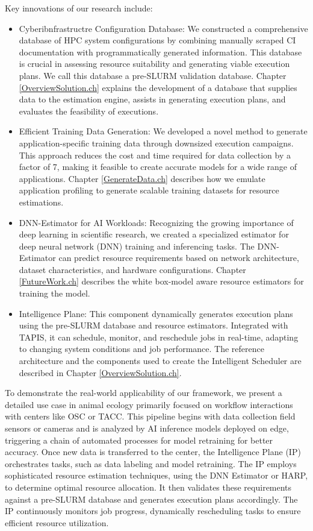 Key innovations of our research include:
\begin{itemize}
    \item Cyberibnfrastructre Configuration Database: We constructed a comprehensive database of HPC system configurations by combining manually scraped CI documentation with programmatically generated information. This database is crucial in assessing resource suitability and generating viable execution plans. We call this database a pre-SLURM validation database. Chapter \ref{OverviewSolution.ch} explains the development of a database that supplies data to the estimation engine, assists in generating execution plans, and evaluates the feasibility of executions.
    \item Efficient Training Data Generation: We developed a novel method to generate application-specific training data through downsized execution campaigns. This approach reduces the cost and time required for data collection by a factor of 7, making it feasible to create accurate models for a wide range of applications. Chapter \ref{GenerateData.ch} describes how we emulate application profiling to generate scalable training datasets for resource estimations. 
    \item DNN-Estimator for AI Workloads: Recognizing the growing importance of deep learning in scientific research, we created a specialized estimator for deep neural network (DNN) training and inferencing tasks. The DNN-Estimator can predict resource requirements based on network architecture, dataset characteristics, and hardware configurations. Chapter \ref{FutureWork.ch} describes the white box-model aware resource estimators for training the model. 
    \item Intelligence Plane: This component dynamically generates execution plans using the pre-SLURM database and resource estimators. Integrated with TAPIS, it can schedule, monitor, and reschedule jobs in real-time, adapting to changing system conditions and job performance. The reference architecture and the components used to create the Intelligent Scheduler are described in Chapter \ref{OverviewSolution.ch}.
\end{itemize}


To demonstrate the real-world applicability of our framework, we present a detailed use case in animal ecology primarily focused on workflow interactions with centers like OSC or TACC. This pipeline begins with data collection field sensors or cameras and is analyzed by AI inference models deployed on edge, triggering a chain of automated processes for model retraining for better accuracy. Once new data is transferred to the center, the Intelligence Plane (IP) orchestrates tasks, such as data labeling and model retraining. The IP employs sophisticated resource estimation techniques, using the DNN Estimator or HARP, to determine optimal resource allocation. It then validates these requirements against a pre-SLURM database and generates execution plans accordingly. The IP continuously monitors job progress, dynamically rescheduling tasks to ensure efficient resource utilization. 

